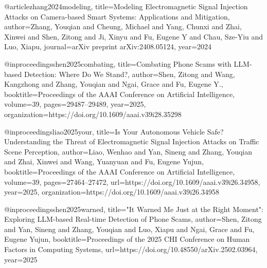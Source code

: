 @article{zhang2024modeling,
  title={Modeling Electromagnetic Signal Injection Attacks on Camera-based Smart Systems: Applications and Mitigation},
  author={Zhang, Youqian and Cheung, Michael and Yang, Chunxi and Zhai, Xinwei and Shen, Zitong and Ji, Xinyu and Fu, Eugene Y and Chau, Sze-Yiu and Luo, Xiapu},
  journal={arXiv preprint arXiv:2408.05124},
  year={2024}
}

@inproceedings{shen2025combating,
  title={Combating Phone Scams with LLM-based Detection: Where Do We Stand?},
  author={Shen, Zitong and Wang, Kangzhong and Zhang, Youqian and Ngai, Grace and Fu, Eugene Y.},
  booktitle={Proceedings of the AAAI Conference on Artificial Intelligence},
  volume={39},
  pages={29487--29489},
  year={2025},
  organization={https://doi.org/10.1609/aaai.v39i28.35298}
}

@inproceedings{liao2025your,
  title={Is Your Autonomous Vehicle Safe? Understanding the Threat of Electromagnetic Signal Injection Attacks on Traffic Scene Perception},
  author={Liao, Wenhao and Yan, Sineng and Zhang, Youqian and Zhai, Xinwei and Wang, Yuanyuan and Fu, Eugene Yujun},
  booktitle={Proceedings of the AAAI Conference on Artificial Intelligence},
  volume={39},
  pages={27464--27472},
  url={https://doi.org/10.1609/aaai.v39i26.34958},
  year={2025},
  organization={https://doi.org/10.1609/aaai.v39i26.34958}
}

@inproceedings{shen2025warned,
  title={"It Warned Me Just at the Right Moment": Exploring LLM-based Real-time Detection of Phone Scams},
  author={Shen, Zitong and Yan, Sineng and Zhang, Youqian and Luo, Xiapu and Ngai, Grace and Fu, Eugene Yujun},
  booktitle={Proceedings of the 2025 CHI Conference on Human Factors in Computing Systems},
  url={https://doi.org/10.48550/arXiv.2502.03964},
  year={2025}
}